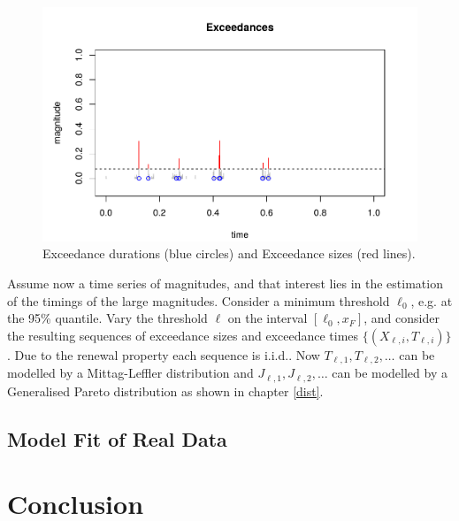 \documentclass[honours,12pt]{unswthesis}
\newcommand{\1}{\mathbf 1}
\numberwithin{equation}{section}
\theoremstyle{definition}
\theoremstyle{remark}
\begin{document}
	\begin{figure}[H]
        \centering
        \includegraphics[width=\textwidth]{Figures/Exceedances.png}
        \caption{Exceedance durations (blue circles) and Exceedance sizes (red lines).}
    \end{figure}


Assume now a time series of magnitudes, and that interest lies in the estimation of the timings of the large magnitudes.
Consider a minimum threshold $\ell_0$, e.g. at the 95\% quantile.
Vary the threshold $\ell$ on the interval $[\ell_0, x_F]$, and consider
the resulting sequences of exceedance sizes and exceedance times 
$\{(X_{\ell,i}, T_{\ell,i})\}$. 
Due to the renewal property each sequence is i.i.d.. Now $T_{\ell,1}, T_{\ell,2}, \ldots$ can be modelled by a Mittag-Leffler distribution and $J_{\ell,1}, J_{\ell,2}, \ldots$ can be modelled by a Generalised Pareto distribution as shown in chapter \ref{dist}.
\section{Model Fit of Real Data}

\chapter{Conclusion}


\clearpage
{}


\end{document}
